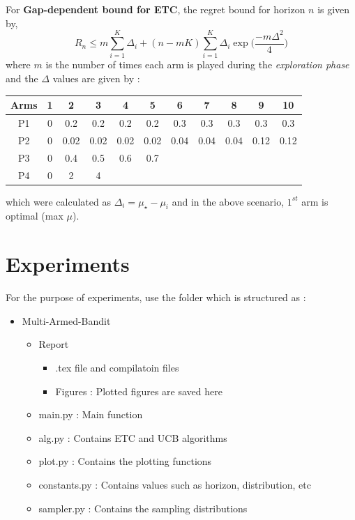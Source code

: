 \documentclass[12pt]{report}
\begin{document}
		\noindent For \textbf{Gap-dependent bound for ETC}, the regret bound for horizon $n$ is given by,
		\begin{equation}
			R_n \leq m \sum_{i=1}^K \Delta_i + (n - mK) \sum_{i=1}^K \Delta_i \exp \Big( \frac{-m \Delta^2}{4} \Big)
		\end{equation}  
		where $m$ is the number of times each arm is played during the \textit{exploration phase} and the $\Delta$ values are given by :
		\begin{table}[H]
  			\centering
  			\begin{tabular}{ | c | c | c | c | c | c | c | c | c | c | c |}
    			\hline
   	 			\textbf{Arms} & \textbf{1} & \textbf{2} & \textbf{3} & \textbf{4} & 					\textbf{5} & \textbf{6} & \textbf{7} & \textbf{8} & \textbf{9} & \textbf{10}\\ 
			    \hline
			    P1 & 0 & 0.2 & 0.2 & 0.2 & 0.2 & 0.3 & 0.3 & 0.3 & 0.3 & 0.3\\
    			\hline
    			P2 & 0 & 0.02 & 0.02 & 0.02 & 0.02 & 0.04 & 0.04 & 0.04 & 0.12 & 0.12\\
    			\hline
    			P3 & 0 & 0.4 & 0.5 & 0.6 & 0.7 & & & & &\\
    			\hline
    			P4 & 0 & 2 & 4 & & & & & & &\\
				\hline
  			\end{tabular}
		\end{table}

		\noindent which were calculated as $\Delta_i = \mu_\star - \mu_i$ and in the above scenario, $1^{st}$ arm is optimal (max $\mu$).



\section{Experiments}
	For the purpose of experiments, use the folder which is structured as :
	\begin{itemize}
		\item Multi-Armed-Bandit
		\begin{itemize}
			\item Report
			\begin{itemize}
				\item .tex file and compilatoin files
				\item Figures : Plotted figures are saved here
			\end{itemize}
			\item main.py : Main function
			\item alg.py : Contains ETC and UCB algorithms
			\item plot.py : Contains the plotting functions
			\item constants.py : Contains values such as horizon, distribution, etc
			\item sampler.py : Contains the sampling distributions
		\end{itemize}
	\end{itemize}
	
\end{document}
